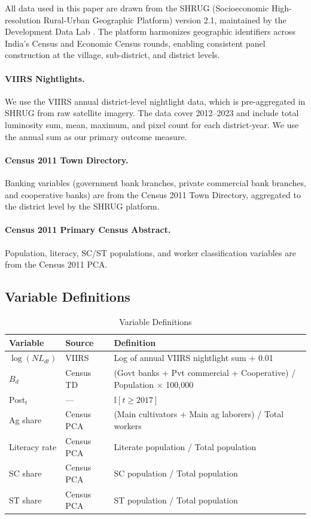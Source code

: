 \documentclass[12pt]{article}
\newcommand{\ind}{\mathbb{I}}
\begin{document}
All data used in this paper are drawn from the SHRUG (Socioeconomic High-resolution Rural-Urban Geographic Platform) version 2.1, maintained by the Development Data Lab \citep{asher2021shrug}. The platform harmonizes geographic identifiers across India's Census and Economic Census rounds, enabling consistent panel construction at the village, sub-district, and district levels.

\paragraph{VIIRS Nightlights.} We use the VIIRS annual district-level nightlight data, which is pre-aggregated in SHRUG from raw satellite imagery. The data cover 2012--2023 and include total luminosity sum, mean, maximum, and pixel count for each district-year. We use the annual sum as our primary outcome measure.

\paragraph{Census 2011 Town Directory.} Banking variables (government bank branches, private commercial bank branches, and cooperative banks) are from the Census 2011 Town Directory, aggregated to the district level by the SHRUG platform.

\paragraph{Census 2011 Primary Census Abstract.} Population, literacy, SC/ST populations, and worker classification variables are from the Census 2011 PCA.

\subsection{Variable Definitions}

\begin{table}[H]
\centering
\caption{Variable Definitions}
\small
\begin{tabular}{llp{8cm}}
\toprule
Variable & Source & Definition \\
\midrule
$\log(NL_{dt})$ & VIIRS & Log of annual VIIRS nightlight sum + 0.01 \\
$B_d$ & Census TD & (Govt banks + Pvt commercial + Cooperative) / Population $\times$ 100,000 \\
Post$_t$ & --- & $\ind[t \geq 2017]$ \\
Ag share & Census PCA & (Main cultivators + Main ag laborers) / Total workers \\
Literacy rate & Census PCA & Literate population / Total population \\
SC share & Census PCA & SC population / Total population \\
ST share & Census PCA & ST population / Total population \\
\bottomrule
\end{tabular}
\end{table}
\end{document}
